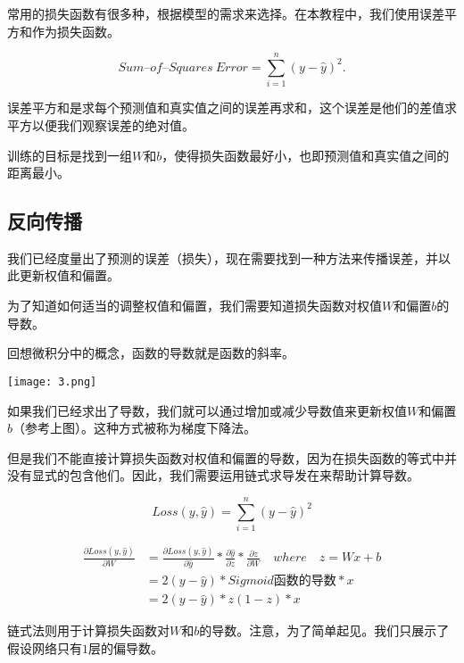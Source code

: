 常用的损失函数有很多种，根据模型的需求来选择。在本教程中，我们使用误差平方和作为损失函数。

\begin{equation}
    Sum\text{--}of\text{--}Squares \ Error = \sum_{i=1}^{n}(y-\hat{y})^2.
\end{equation}

误差平方和是求每个预测值和真实值之间的误差再求和，这个误差是他们的差值求平方以便我们观察误差的绝对值。

训练的目标是找到一组$W$和$b$，使得损失函数最好小，也即预测值和真实值之间的距离最小。

\subsection{反向传播}

我们已经度量出了预测的误差（损失），现在需要找到一种方法来传播误差，并以此更新权值和偏置。

为了知道如何适当的调整权值和偏置，我们需要知道损失函数对权值$W$和偏置$b$的导数。

回想微积分中的概念，函数的导数就是函数的斜率。

\noindent\texttt{[image: 3.png]}

如果我们已经求出了导数，我们就可以通过增加或减少导数值来更新权值$W$和偏置$b$（参考上图）。这种方式被称为梯度下降法。

但是我们不能直接计算损失函数对权值和偏置的导数，因为在损失函数的等式中并没有显式的包含他们。因此，我们需要运用链式求导发在来帮助计算导数。

\begin{equation}
    Loss(y,\hat{y})=\sum_{i=1}^{n}(y-\hat{y})^2
\end{equation}

\begin{equation}
    \begin{split}
        \frac{\partial Loss(y,\hat{y})}{\partial W} &= 
        \frac{\partial Loss(y,\hat{y})}{\partial \hat{y}} * \frac{\partial \hat{y}}{\partial z} * \frac{\partial z}{\partial W} \quad where \quad z = Wx + b \\
        &= 2(y-\hat{y})*Sigmoid函数的导数*x \\
        &= 2(y-\hat{y})*z(1-z)*x
    \end{split}
\end{equation}

链式法则用于计算损失函数对$W$和$b$的导数。注意，为了简单起见。我们只展示了假设网络只有$1$层的偏导数。

